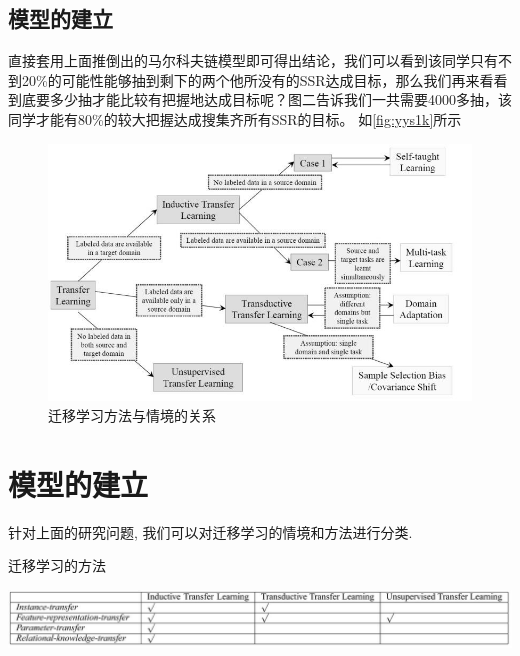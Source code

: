 \documentclass[10pt,journal,compsoc]{IEEEtran}
\begin{document}
\subsection{模型的建立}
直接套用上面推倒出的马尔科夫链模型即可得出结论，我们可以看到该同学只有不到20\%的可能性能够抽到剩下的两个他所没有的SSR达成目标，那么我们再来看看到底要多少抽才能比较有把握地达成目标呢？图二告诉我们一共需要4000多抽，该同学才能有80\%的较大把握达成搜集齐所有SSR的目标。
如\ref{fig:yys1k}所示
\begin{figure}[!ht]
  \centering
  \includegraphics[width=30pc]{img/survey_fig1.jpg}
  \caption{迁移学习方法与情境的关系}
  \label{fig:survey_method}
  \end{figure}





\section{模型的建立}

针对上面的研究问题, 我们可以对迁移学习的情境和方法进行分类. 

\begin{table}[!ht]
\centering
\caption{迁移学习的方法}
\label{tab:survey_method}
\includegraphics[width=40pc]{img/survey_tab3.jpg}
\end{table}
\end{document}
